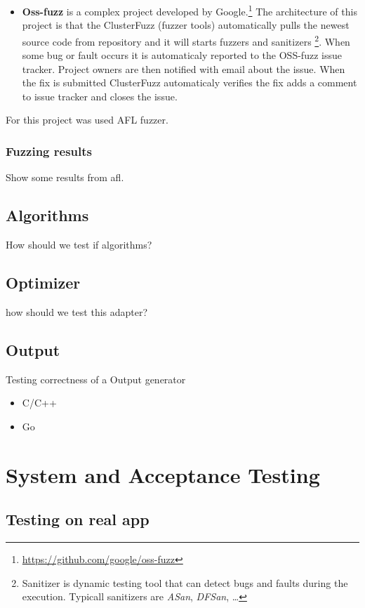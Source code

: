 \begin{itemize}
	\item \textbf{Oss-fuzz} is a complex project developed by Google.\footnote{\url{https://github.com/google/oss-fuzz}}
	The architecture of this project is that the ClusterFuzz (fuzzer tools) automatically pulls the newest source code
	from repository and it will starts fuzzers and sanitizers
	\footnote{Sanitizer is dynamic testing tool that can detect bugs and faults during the execution. Typicall sanitizers are \textit{ASan}, \textit{DFSan}, \ldots}.
	When some bug or fault occurs it is automaticaly reported to the OSS-fuzz issue tracker.
	Project owners are then notified with email about the issue.
	When the fix is submitted ClusterFuzz automaticaly verifies the fix adds a comment to issue tracker and closes the issue.

\end{itemize}

For this project was used AFL fuzzer. 

\subsubsection{Fuzzing results}
Show some results from afl.

\subsection{Algorithms}
How should we test if algorithms?

\subsection{Optimizer}
how should we test this adapter?

\subsection{Output}
Testing correctness of a Output generator
\begin{itemize}
	\item{C/C++}
	\item{Go}
\end{itemize}

\section{System and Acceptance Testing}
\subsection{Testing on real app}
